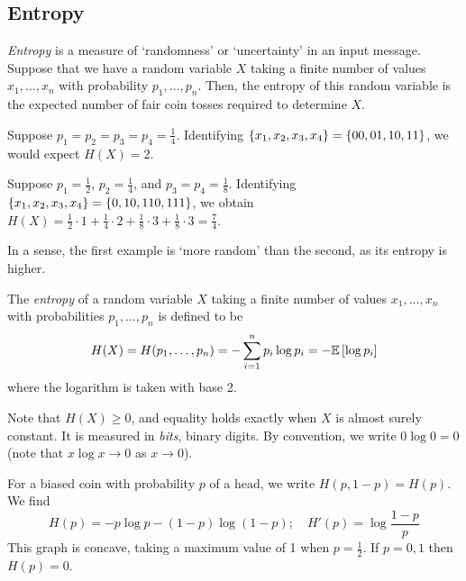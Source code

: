 \subsection{Entropy}
\emph{Entropy} is a measure of `randomness' or `uncertainty' in an input message.
Suppose that we have a random variable \( X \) taking a finite number of values \( x_1, \dots, x_n \) with probability \( p_1, \dots, p_n \).
Then, the entropy of this random variable is the expected number of fair coin tosses required to determine \( X \).
\begin{example}
    Suppose \( p_1 = p_2 = p_3 = p_4 = \frac{1}{4} \).
    Identifying \( \qty{x_1, x_2, x_3, x_4} = \qty{00, 01, 10, 11} \), we would expect \( H(X) = 2 \).
\end{example}
\begin{example}
    Suppose \( p_1 = \frac{1}{2} \), \( p_2 = \frac{1}{4} \), and \( p_3 = p_4 = \frac{1}{8} \).
    Identifying \( \qty{x_1, x_2, x_3, x_4} = \qty{0, 10, 110, 111} \), we obtain \( H(X) = \frac{1}{2} \cdot 1 + \frac{1}{4} \cdot 2 + \frac{1}{8} \cdot 3 + \frac{1}{8} \cdot 3 = \frac{7}{4} \).
\end{example}
In a sense, the first example is `more random' than the second, as its entropy is higher.
\begin{definition}
    The \emph{entropy} of a random variable \( X \) taking a finite number of values \( x_1, \dots, x_n \) with probabilities \( p_1, \dots, p_n \) is defined to be
    \[ H(X) = H(p_1, \dots, p_n) = -\sum_{i=1}^n p_i \log p_i = -\mathbb{E}\left[{\log p_i}\right] \]
    where the logarithm is taken with base 2.
\end{definition}
Note that \( H(X) \geq 0 \), and equality holds exactly when \( X \) is almost surely constant.
It is measured in \emph{bits}, binary digits.
By convention, we write \( 0 \log 0 = 0 \) (note that \( x \log x \to 0 \) as \( x \to 0 \)).
\begin{example}
    For a biased coin with probability \( p \) of a head, we write \( H(p,1-p) = H(p) \).
    We find
    \[ H(p) = -p\log p - (1-p)\log(1-p);\quad H'(p) = \log \frac{1-p}{p} \]
    This graph is concave, taking a maximum value of 1 when \( p = \frac{1}{2} \).
    If \( p = 0, 1 \) then \( H(p) = 0 \).
\end{example}

